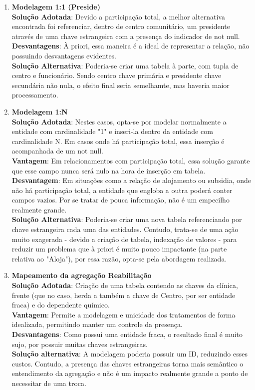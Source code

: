\begin{enumerate}

    \item \textbf{Modelagem 1:1 (Preside)}
    \\
    \textbf{Solução Adotada}: Devido a participação total, a melhor alternativa encontrada foi referenciar, dentro de centro comunitário, um presidente através de uma chave estrangeira com a presença do indicador de not null.
    \\
    \textbf{Desvantagens}: À priori, essa maneira é a ideal de representar a relação, não possuindo desvantagens evidentes.
    \\
    \textbf{Solução Alternativa}: Poderia-se criar uma tabela à parte, com tupla de centro e funcionário. Sendo centro chave primária e presidente chave secundária não nula, o efeito final seria semelhamte, mas haveria maior processamento.

    
    \item \textbf{Modelagem 1:N}
    \\
    \textbf{Solução Adotada}: Nestes casos, opta-se por modelar normalmente a entidade com cardinalidade "1" e inseri-la dentro da entidade com cardinalidade N. Em casos onde há participação total, essa inserção é acompanhada de um not null.
    \\
    \textbf{Vantagem}: Em relacionamentos com participação total, essa solução garante que esse campo nunca será nulo na hora de inserção em tabela.
    \\
    \textbf{Desvantagem}: Em situações como a relação de alojamento ou subsidia, onde não há participação total, a entidade que engloba a outra poderá conter campos vazios. Por se tratar de pouca informação, não é um empecilho realmente grande.
    \\
    \textbf{Solução Alternativa}: Poderia-se criar uma nova tabela referenciando por chave estrangeira cada uma das entidades. Contudo, trata-se de uma ação muito exagerada - devido a criação de tabela, indexação de valores - para reduzir um problema que à priori é muito pouco impactante (na parte relativa ao "Aloja"), por essa razão, opta-se pela abordagem realizada.

    \item \textbf{Mapeamento da agregação Reabilitação}
    \\
    \textbf{Solução Adotada}: Criação de uma tabela contendo as chaves da clínica, frente (que no caso, herda a também a chave de Centro, por ser entidade fraca) e do dependente químico.
    \\
    \textbf{Vantagem}: Permite a modelagem e unicidade dos tratamentos de forma idealizada, permitindo manter um controle da presença.
    \\ 
    \textbf{Desvantagens}: Como possui uma entidade fraca, o resultado final é muito sujo, por possuir muitas chaves estrangeiras.
    \\
    \textbf{Solução alternativa}: A modelagem poderia possuir um ID, reduzindo esses custos. Contudo, a presença das chaves estrangeiras torna mais semântico o entendimento da agregação e não é um impacto realmente grande a ponto de necessitar de uma troca.


\end{enumerate}
